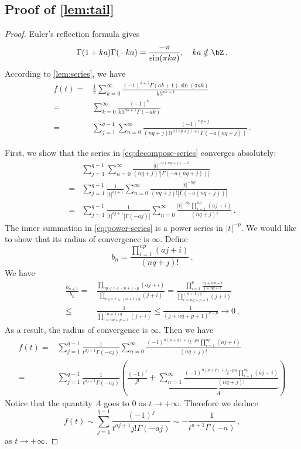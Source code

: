 \documentclass[11pt]{article}
\begin{document}
\subsection{Proof of \cref{lem:tail}}\label{sec:proof-tail}
\begin{proof}
Euler's reflection formula gives \[
\Gamma(1+k a)\Gamma(-k a) = \frac{-\pi}{\sin(\pi k a)},\quad k a\notin \bZ\,.
\]
According to \cref{lem:series}, we have
\begin{align}
    f(t) ={}& \frac{1}{\pi}\sum_{k=0}^\infty  \frac{(-1)^{k+1}\Gamma(ak+1)\sin(\pi ak)}{k! t^{ak+1}}\nonumber\\
    ={}& \sum_{k=0}^{\infty} \frac{(-1)^k}{k! t^{ak+1} \Gamma(-ak) }\nonumber\\
={}& \sum_{j=1}^{q-1}\sum_{n=0}^\infty  \frac{(-1)^{nq+j}}{(nq+j)! t^{a(nq+j)+1}\Gamma(-a(nq+j))} \,.\label{eq:decompose-series}
\end{align}

First, we show that the series in \eqref{eq:decompose-series}
converges absolutely:
\begin{align}
& \sum_{j=1}^{q-1} \sum_{n=0}^\infty \frac{ |t|^{-a (nq+j)-1}}{(nq+j)! |\Gamma (-a (nq+j))|} \nonumber \\
={}& \sum_{j=1}^{q-1} \frac{1}{|t|^{aj+1}} \sum_{n=0}^\infty \frac{ |t|^{-np}}{(nq+j)! |\Gamma (-a (nq+j))|}\nonumber  \\
={}& \sum_{j=1}^{q-1} \frac{1}{|t|^{aj+1} |\Gamma (-a j)|} \sum_{n=0}^\infty \frac{ |t|^{-np} \prod_{i=1}^{n p} (aj+i)}{(nq+j)! }\,. \label{eq:power-series} 
\end{align}
The inner summation in \eqref{eq:power-series} is a power series in $|t|^{-p}$. We would like to show that its radius of convergence is $\infty$. Define \[
b_n = \frac{ \prod_{i=1}^{n p} (aj+i)}{(nq+j)! }\,.
\]
We have \begin{align*}
    \frac{b_{n+1}}{b_n} ={}&  \frac{\prod_{np<i\le (n+1)p} (aj+i)}{\prod_{nq<i\le (n+1)q} (j+i)} = \frac{\prod_{i=1}^p \frac{aj+np+i}{j+nq+i} }{\prod_{i=nq+p+1}^{(n+1)q} (j+i) }\\
    \le{}& \frac{1 }{\prod_{i=nq+p+1}^{(n+1)q} (j+i) } \le \frac{1}{(j+nq+p+1)^{q-p}}\to 0 \,.
\end{align*}
As a result, the radius of convergence is $\infty$. Then we have 
\begin{align*}
    f(t)
    ={}& \sum_{j=1}^{q-1} \frac{1}{t^{aj+1} \Gamma (-a j)}\sum_{n=0}^\infty \frac{ (-1)^{n(p+q)+j} t^{-pn} \prod_{i=1}^{np}(aj+i)}{(nq+j)! }\\
    ={}& \sum_{j=1}^{q-1} \frac{1}{t^{aj+1} \Gamma (-a j)}\left(
    \frac{(-1)^j}{j!}+ \underbrace{\sum_{n=1}^\infty \frac{ (-1)^{n(p+q)+j} t^{-pn} \prod_{i=1}^{np}(aj+i)}{(nq+j)! }}_{A}\right)
\end{align*}
Notice that the quantity $A$ goes to $0$ 
as $t\to +\infty$. Therefore we deduce \[
f(t)
\sim 
\sum_{j=1}^{q-1} \frac{(-1)^j}{t^{aj+1}j! \Gamma (-a j)} \sim -\frac{1}{t^{a+1}\Gamma(-a)}\,, 
\]
as $t\to+\infty$.
\end{proof}
\end{document}
